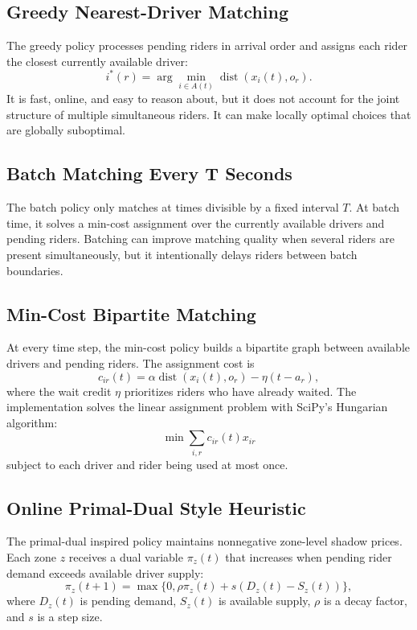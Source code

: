 \documentclass[11pt]{article}
\begin{document}
\subsection{Greedy Nearest-Driver Matching}

The greedy policy processes pending riders in arrival order and assigns each rider the closest currently available driver:
\[
i^*(r) = \arg\min_{i \in A(t)} \operatorname{dist}(x_i(t), o_r).
\]
It is fast, online, and easy to reason about, but it does not account for the joint structure of multiple simultaneous riders. It can make locally optimal choices that are globally suboptimal.

\subsection{Batch Matching Every T Seconds}

The batch policy only matches at times divisible by a fixed interval \(T\). At batch time, it solves a min-cost assignment over the currently available drivers and pending riders. Batching can improve matching quality when several riders are present simultaneously, but it intentionally delays riders between batch boundaries.

\subsection{Min-Cost Bipartite Matching}

At every time step, the min-cost policy builds a bipartite graph between available drivers and pending riders. The assignment cost is
\[
c_{ir}(t) = \alpha \operatorname{dist}(x_i(t), o_r) - \eta (t - a_r),
\]
where the wait credit \(\eta\) prioritizes riders who have already waited. The implementation solves the linear assignment problem with SciPy's Hungarian algorithm:
\[
\min \sum_{i,r} c_{ir}(t) x_{ir}
\]
subject to each driver and rider being used at most once.

\subsection{Online Primal-Dual Style Heuristic}

The primal-dual inspired policy maintains nonnegative zone-level shadow prices. Each zone \(z\) receives a dual variable \(\pi_z(t)\) that increases when pending rider demand exceeds available driver supply:
\[
\pi_z(t+1) =
\max\{0, \rho \pi_z(t) + s(D_z(t) - S_z(t))\},
\]
where \(D_z(t)\) is pending demand, \(S_z(t)\) is available supply, \(\rho\) is a decay factor, and \(s\) is a step size.
\end{document}
